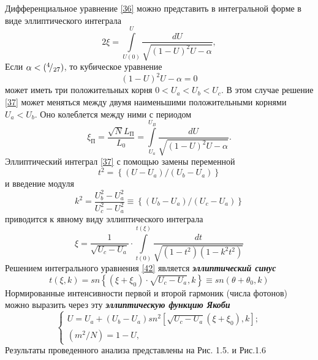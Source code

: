 \documentclass[a4paper]{article}
\begin{document}
	Дифференциальное уравнение \eqref{36} можно представить в интегральной форме в виде эллиптического интеграла 
	\begin{equation}
		2\xi=\int\limits_{U(0)}^{U}\frac{dU}{\sqrt{(1-U)^{2}U-\alpha}},\label{37}
	\end{equation}
	Если $\alpha<({}^{4}\!/_{27})$, то кубическое уравнение
	\begin{equation}
		(1-U)^{2}U-\alpha=0\label{38}
	\end{equation}
	может иметь три положительных корня $0<U_{a}<U_{b}<U_{c}$. В этом случае решение \eqref{37} может меняться между двумя наименьшими положительными корнями $U_{a}<U_{b}$. Оно колеблется между ними с периодом 
	\begin{equation}
		\xi_{\text{П}}=\frac{\sqrt{N}L_{\text{П}}}{L_{0}}=\int\limits_{U_{a}}^{U_{B}}\frac{dU}{\sqrt{(1-U)^{2}U-\alpha}}.\label{39}
	\end{equation}
	Эллиптический интеграл \eqref{37} с помощью замены переменной 
	\begin{equation}
		t^{2}=\left\{\left(U-U_{a}\right)/\left(U_{b}-U_{a}\right)\right\}\label{40}
	\end{equation}
	и введение модуля
	\begin{equation}
		k^{2}=\frac{U_{b}^{2}-U_{a}^{2}}{U_{c}^{2}-U_{a}^{2}}\equiv\left\{\left(U_{b}-U_{a}\right)/\left(U_{c}-U_{a}\right)\right\}\label{41}
	\end{equation}
	приводится к явному виду эллиптического интеграла
	\begin{equation}
		\xi=\frac{1}{\sqrt{U_{c}-U_{a}}}\cdot\int\limits_{t(0)}^{t(\xi)}\frac{dt}{\sqrt{(1-t^{2})(1-k^{2}t^{2})}}\label{42}
	\end{equation}
	Решением интегрального уравнения \eqref{42} является \textit{\textbf{эллиптический синус}} 
	\begin{equation}
		t(\xi,k)=sn\left\{\left(\xi+\xi_{0}\right)\cdot\sqrt{U_{c}-U_{a}},k\right\}\equiv sn(\theta+\theta_{0},k)
	\end{equation}
	Нормированные интенсивности первой и второй гармоник (числа фотонов)  можно выразить через эту \textit{\textbf{эллиптическую функцию Якоби}} 
	\begin{equation}
		\begin{cases}
			U=U_{a}+(U_{b}-U_{a})sn^{2}\left[\sqrt{U_{c}-U_{a}}(\xi+\xi_{0}),k\right];\\
			(m^{2}/N)=1-U,\
		\end{cases}\label{44}
	\end{equation}
	Результаты проведенного анализа представлены на Рис. 1.5.  и Рис.1.6
	\vspace{4cm}
	
\end{document}
